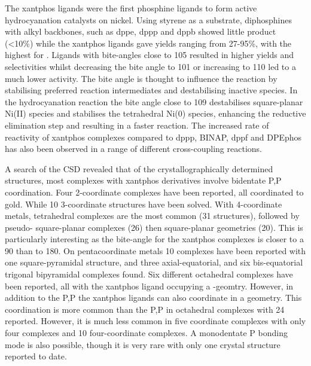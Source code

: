 The xantphos ligands were the first phosphine ligands to form active hydrocyanation catalysts on nickel.\cite{Kranenburg1995b}  Using styrene as a substrate, diphosphines with alkyl backbones, such as \gls{dppe}, \gls{dppp} and \gls{dppb} showed little product (<10\%) while the xantphos ligands gave yields ranging from 27-95\%, with the highest for \Phsixantphos{}.  Ligands with bite-angles close to 105\degrees{} resulted in higher yields and selectivities whilst decreasing the bite angle to 101\degrees{} or increasing to 110\degrees{} led to a much lower activity.  The bite angle is thought to influence the reaction by stabilising preferred reaction intermediates and destabilising inactive species.   In the hydrocyanation reaction the bite angle close to 109\degrees{} destabilises square-planar Ni(II) species and stabilises the tetrahedral Ni(0) species, enhancing the reductive elimination step and resulting in a faster reaction.\cite{Goertz1998}  The increased rate of reactivity of xantphos complexes compared to \gls{dppp}, \gls{BINAP}, \gls{dppf} and \gls{DPEphos} has also been observed in a range of different cross-coupling reactions.\cite{Birkholz2009}

A search of the \gls{CSD} revealed that of the crystallographically determined structures, most complexes with xantphos derivatives involve bidentate \dento{}P,P\textprime{} coordination.  Four 2-coordinate complexes have been reported, all coordinated to gold.  While 10 3-coordinate structures have been solved.  With 4-coordinate metals, tetrahedral complexes are the most common (31 structures), followed by pseudo-\trans{} square-planar complexes (26) then \cis{} square-planar geometries (20).  This is particularly interesting as the bite-angle for the xantphos complexes is closer to a 90\degrees{} than to 180\degrees.  On pentacoordinate metals 10 complexes have been reported with one square-pyramidal structure, and three axial-equatorial, and six bis-equatorial trigonal bipyramidal complexes found.  Six different octahedral complexes have been reported, all with the xantphos ligand occupying a \cis{}-geomtry.  However, in addition to the \dento{}P,P\textprime{} the xantphos ligands can also coordinate in a \POP{} geometry.  This \POP{} coordination is more common than the \dento{}P,P\textprime{} in octahedral complexes with 24 reported.  However, it is much less common in five coordinate complexes with only four \POP{} complexes and 10 \POP{} four-coordinate complexes.  A monodentate \dento{}P bonding mode is also possible, though it is very rare with only one crystal structure reported to date.\cite{Escalle2009}

